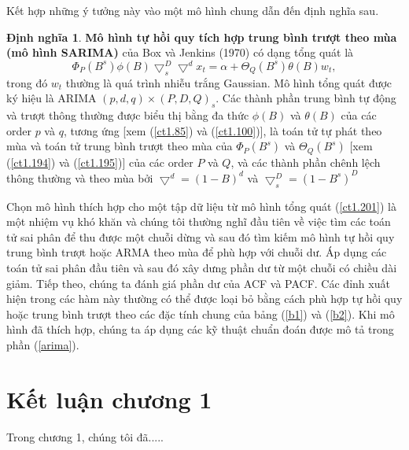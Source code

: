 \documentclass[12pt, a4paper,oneside]{book}
\theoremstyle{definition}
\newtheorem{dn}[theo]{Định nghĩa}
\begin{document}
Kết hợp những ý tưởng này vào một mô hình chung dẫn đến định nghĩa sau.
\begin{dn}\textbf{Mô hình tự hồi quy tích hợp trung bình trượt theo mùa (mô hình SARIMA)} của Box và Jenkins (1970) có dạng tổng quát là
\begin{equation}
\Phi_ {P} (B^{s})	\phi(B)\bigtriangledown_{s}^{D}\bigtriangledown^{d}x_{t}=\alpha + \varTheta_{Q}(B^{s})\theta(B)w_{t}, \label{ct1.201}
\end{equation}	
trong đó $w_{t}$ thường là quá trình nhiễu trắng Gaussian. Mô hình tổng quát được ký hiệu là ARIMA $(p, d, q) \times (P, D, Q )_{s}$. Các thành phần trung bình tự động và trượt thông thường được biểu thị bằng đa thức $\phi(B)$ và $\theta(B)$ của các order $p$ và $q$, tương ứng [xem (\ref{ct1.85}) và (\ref{ct1.100})],
là toán tử tự phát theo mùa và toán tử trung bình trượt theo mùa của $\Phi_ {P} (B^{s})$ và $\varTheta_{Q}(B^{s})$ [xem (\ref{ct1.194}) và (\ref{ct1.195})] của các order $P$ và $Q$, và các thành phần chênh lệch thông thường và theo mùa bởi $\bigtriangledown^{d}=(1-B)^{d}$ và $\bigtriangledown^{D}_{s}=(1-B^{s})^{D}$
\end{dn}
Chọn mô hình thích hợp cho một tập dữ liệu từ mô hình tổng quát (\ref{ct1.201}) là một nhiệm vụ khó khăn và chúng tôi thường nghĩ đầu tiên về việc tìm các toán tử sai phân để thu được một chuỗi dừng và sau đó tìm kiếm mô hình tự hồi quy trung bình trượt hoặc ARMA theo mùa để phù hợp với chuỗi dư. Áp dụng các toán tử sai phân đầu tiên và sau đó xây dưng phần dư từ một chuỗi có chiều dài giảm. Tiếp theo, chúng ta đánh giá phần dư của ACF và PACF. Các đỉnh xuất hiện trong các hàm này thường có thể được loại bỏ bằng cách phù hợp tự hồi quy hoặc trung bình trượt theo các đặc tính chung của bảng (\ref{b1}) và (\ref{b2}). Khi mô hình đã thích hợp, chúng ta áp dụng các kỹ thuật chuẩn đoán được mô tả trong phần (\ref{arima}).
\section*{Kết luận chương 1}
Trong chương 1, chúng tôi đã.....
\end{document}
